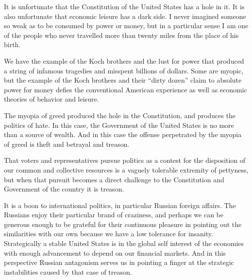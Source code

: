 

It is unfortunate that the Constitution of the United States has a
hole in it.  It is also unfortunate that economic leisure has a dark
side.  I never imagined someone so weak as to be consumed by power or
money, but in a particular sense I am one of the people who never
travelled more than twenty miles from the place of his birth.  

We have the example of the Koch brothers and the lust for power that
produced a string of infamous tragedies and misspent billions of
dollars.  Some are myopic, but the example of the Koch brothers and
their ``dirty dozen'' claim to absolute power for money defies the
conventional American experience as well as economic theories of
behavior and leisure.  

The myopia of greed produced the hole in the Constitution, and
produces the politics of hate.  In this case, the Government of the
United States is no more than a source of wealth.  And in this case
the offense perpetrated by the myopia of greed is theft and betrayal
and treason.  

That voters and representatives pursue politics as a contest for the
disposition of our common and collective resources is a vaguely
tolerable extremity of pettyness, but when that pursuit becomes a
direct challenge to the Constitution and Government of the country it
is treason.

It is a boon to international politics, in particular Russian foreign
affairs.  The Russians enjoy their particular brand of craziness, and
perhaps we can be generous enough to be grateful for their continuous
pleasure in pointing out the similarities with our own because we have
a low tolerance for insanity.  Strategically a stable United States is
in the global self interest of the economies with enough advancement
to depend on our financial markets.  And in this perspective Russian
antagonism serves us in pointing a finger at the strategic
instabilities caused by that case of treason.

\bye
